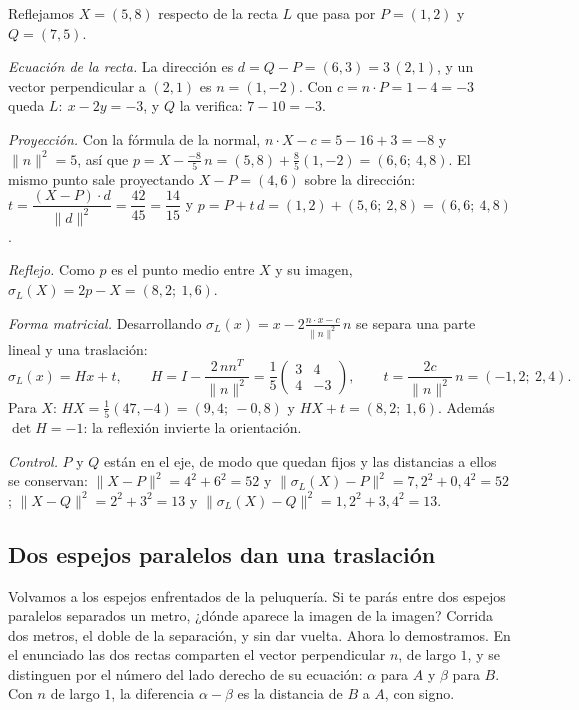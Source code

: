 \begin{ejemplo}\label{ej:reflexion-dos-puntos}
Reflejamos \(X=(5,8)\) respecto de la recta \(L\) que pasa por \(P=(1,2)\) y \(Q=(7,5)\).

\emph{Ecuación de la recta.} La dirección es \(d=Q-P=(6,3)=3\,(2,1)\), y un vector
perpendicular a \((2,1)\) es \(n=(1,-2)\). Con \(c=n\cdot P=1-4=-3\) queda \(L:\ x-2y=-3\),
y \(Q\) la verifica: \(7-10=-3\).

\emph{Proyección.} Con la fórmula de la normal, \(n\cdot X-c=5-16+3=-8\) y
\(\lVert n\rVert^2=5\), así que \(p=X-\frac{-8}{5}\,n=(5,8)+\frac85(1,-2)=(6{,}6;\ 4{,}8)\).
El mismo punto sale proyectando \(X-P=(4,6)\) sobre la dirección:
\(t=\dfrac{(X-P)\cdot d}{\lVert d\rVert^2}=\dfrac{42}{45}=\dfrac{14}{15}\) y
\(p=P+t\,d=(1,2)+(5{,}6;\ 2{,}8)=(6{,}6;\ 4{,}8)\).

\emph{Reflejo.} Como \(p\) es el punto medio entre \(X\) y su imagen,
\(\sigma_{L}(X)=2p-X=(8{,}2;\ 1{,}6)\).

\emph{Forma matricial.} Desarrollando \(\sigma_{L}(x)=x-2\frac{n\cdot x-c}{\lVert n\rVert^2}\,n\)
se separa una parte lineal y una traslación:
\[
  \sigma_{L}(x)=Hx+t,\qquad
  H=I-\frac{2\,nn^T}{\lVert n\rVert^2}=\frac15\begin{pmatrix}3&4\\4&-3\end{pmatrix},\qquad
  t=\frac{2c}{\lVert n\rVert^2}\,n=(-1{,}2;\ 2{,}4).
\]
Para \(X\): \(HX=\frac15(47,-4)=(9{,}4;\ -0{,}8)\) y \(HX+t=(8{,}2;\ 1{,}6)\). Además
\(\det H=-1\): la reflexión invierte la orientación.

\emph{Control.} \(P\) y \(Q\) están en el eje, de modo que quedan fijos y las distancias a ellos se
conservan: \(\lVert X-P\rVert^2=4^2+6^2=52\) y
\(\lVert \sigma_{L}(X)-P\rVert^2=7{,}2^2+0{,}4^2=52\);
\(\lVert X-Q\rVert^2=2^2+3^2=13\) y
\(\lVert \sigma_{L}(X)-Q\rVert^2=1{,}2^2+3{,}4^2=13\).
\end{ejemplo}

\subsection{Dos espejos paralelos dan una traslación}\label{sec:espejos-paralelos}

Volvamos a los espejos enfrentados de la peluquería. Si te parás entre dos espejos paralelos
separados un metro, ¿dónde aparece la imagen de la imagen? Corrida dos metros, el doble de la
separación, y sin dar vuelta. Ahora lo demostramos. En el enunciado las dos rectas comparten el
vector perpendicular \(n\), de largo \(1\), y se distinguen por el número del lado derecho de su
ecuación: \(\alpha\) para \(A\) y \(\beta\) para \(B\). Con \(n\) de largo \(1\), la diferencia
\(\alpha-\beta\) es la distancia de \(B\) a \(A\), con signo.

